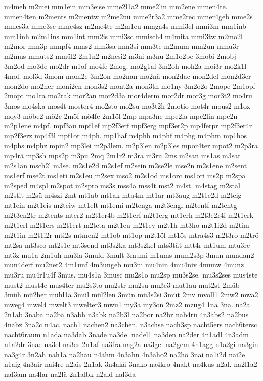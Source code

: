 {m4meh
m2mei
mm1ein
mm3eise
mme2l1a2
mme2lin
mm2ene
mmen4te.
mmen4ten
m2ments
m2mentw
m2me2nü
mme2r3a2
mme2rec
mmer4geb
mme2s
mmes3a
mme3sc
mme4sz
m2me4te
m2m1eu
mmga4s
mmi3el
mmi3m
mm1inb
mm1inh
m2m1ins
mm1int
mm2is
mmi3sc
mmisch4
m4mita
mmi3tw
m2mo2l
m2mor
mm3p
mmpf4
mms2
mm3sa
mm3si
mm3te
m2mum
mm2un
mmu3r
m2mus
mmuts2
mmül2
2m1n2
m2nesi2
m3ni
m3nu
2m1o2be
3mobi
2mobj
3m2od
mo3de
mo2dr
m1of
mo4fe
2mog.
mo2g1al
3m2oh
moh2a
moi3r
mo2k1l
4mol.
mol3d
3mom
mom2e
3m2on
mo2nan
mo2nä
mon2dac
mon2del
mon2d3er
mon2do
mo2ner
moni2en
mon3s2
mont2a
mon3th
mo1ny
3m2o2o
2mope
2m1opf
2mopt
mo1ra
mo2rak
mor2an
mor2d3a
mor4derm
mor2dr
mor3g
mor3t2
mo4ru
3mos
mo4ska
mos4t
moster4
mo2sto
mo2su
mo3t2h
2motio
mot4r
mous2
m1ox
moy3
möbe2
mö2c
2möf
mö4fe
2m1öl
2mp
mpa3ne
mpe2la
mpe2lin
mpe2n
m2p1ene
m4pf.
mpf3au
mpf1ef
mp2f3erf
mpf3erg
mpf3er2p
mp4ferpr
mp2f3er4r
mp2f3erz
mp4f3l
mpf1or
m4ph.
mp1haf
m4phb
m4phf
m4phg
m4phm
mp1hos
m4phs
m4phz
mpin2
mp3lei
m2p3lem.
m2p3len
m2p3les
mpor4ter
mpot2
m2p3ra
mp4rä
mp3sh
mps2p
m3pu
2mq
2m1r2
m3ra
m3ru
2ms
m2san
ms1as
m3sat
m2s1än
msch2l
m3se.
m2s1e2d
m2s1ef
m2sein
m2se2le
mse2n
m2s1ene
m2sent
ms1erf
mse2t
ms1eti
m2s1eu
m2sex
mso2
m2s1od
ms1orc
ms1ori
ms2p
m2spä
m2sped
m4spl
m2spot
m2spro
ms3s
mss4a
mss4t
mst2
m4st.
m4stag
m2stal
m2stit
m2sü
m4szi
2mt
mt1ab
mt1ak
mta4m
mt1ar
mt3aug
m2t1e2d
m2teig
mt1ein
m2t1eis
m2teiw
mt1elt
mt1emi
m2tenga
m2t3engl
m2tentf
m2tentg
m2t3en2tr
m2tents
mter2
m2t1er4b
m2t1erf
m2t1erg
mt1erh
m2t3e2r4i
m2t1erk
m2t1erl
m2t1ers
m2t1ert
m2teta
m2t1eu
m2t1ev
m2t1h
mt3ho
m2t1i2d
m2tim
m2t1in
m2t1i2r
mti2s
mtmen2
mt1ob
mt1op
m2t1öl
mt1ös
mtra4s3
m2t3ro
m2trö
mt2sa
mt3sco
mt2s1e
mt3send
mt3s2ka
mt3s2kel
mts3tät
mtt4r
mt1um
mtu3re
mt3z
mu1a
2m1uh
mu3la
3muld
3mult
3mumi
m1ums
mum2s3p
3mun
mundan2
mun4derf
mu2ner2
4m1unf
4m3ungeb
mu3ni
mu4nin
4mu4niv
4munw
4munz
mu3ru
mu4r1u4f
3mus.
mu4s1a
3musc
mu2s1o
mu2sp
mu3s2se.
mu3s2ses
mus4ste
must2
must4e
mus4ter
mu2s3to
mu2str
mu2su
muße3
mut1au
mut2st
2müb
3müh
mü2her
mühl1a
3mül
mül2len
3mün
mü3s2si
3müt
2mv
mvoll1
2mw2
mwa2
mweg4
mwel4
mwelt3
mwelter3
mwu1
my3a
my3on
2mz2
mzug4
1na
3na.
na2a
2n1ab
3naba
na2bä
n3abh
n3abk
na2b3l
na2bor
na2br
nab4rü
4n3abs2
na2bus
4nabz
3na2c
n4ac.
nach1
nachen2
na3chen.
n3achse
nach3sp
nacht5ers
nach6tersc
nacht6raum
n1ada
na3dab
3nade
na3de.
nadel1
na3den
na2der
4n1adl
4n3adm
n1a2dr
3nae
na3el
na3es
2n1af
na3fra
nag2a
na3ge.
na2gem
4n1agg
n1a2gi
na3gin
na3g4r
3n2ah
nah1a
na2hau
n4ahm
4n3ahn
4n3aho2
na2hö
3nai
na1i2d
nai2e
n1aig
4n3air
nai4re
n2ais
2n1ak
3n4akä
3nako
na4kro
4nakt
na4kus
n2al.
na2l1a2
nal3am
na4lar
na2lä
2n1albk
n2ald
nal3da
}
